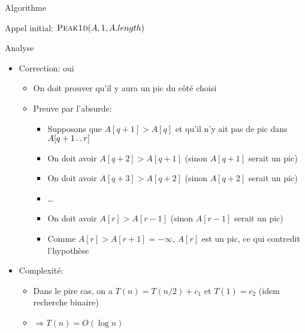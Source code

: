 \begin{frame}{Algorithme}

\begin{center}
{\small
{}
}
\end{center}

\centerline{Appel initial: $\textnormal{\scshape Peak1d}(A,1,A.length)$}

\end{frame}

\begin{frame}{Analyse}
\begin{itemize}
\item Correction: oui
\begin{itemize}
\item On doit prouver qu'il y aura un pic du côté choisi
\item Preuve par l'absurde:
\begin{itemize}
\item Supposons que $A[q+1]>A[q]$ et qu'il n'y ait pas de pic dans $A[q+1\mathinner{\ldotp\ldotp} r]$
\item On doit avoir $A[q+2]>A[q+1]$ (sinon $A[q+1]$ serait un pic)
\item On doit avoir $A[q+3]>A[q+2]$ (sinon $A[q+2]$ serait un pic)
\item \ldots
\item On doit avoir $A[r]>A[r-1]$ (sinon $A[r-1]$ serait un pic)
\item Comme $A[r]>A[r+1]=-\infty$, $A[r]$ est un pic, ce qui contredit l'hypothèse
\end{itemize}
\end{itemize}

\bigskip

\item Complexité:
\begin{itemize}
\item Dans le pire cas, on a $T(n)=T(n/2)+c_1$ et $T(1)=c_2$ (idem recherche binaire)
\item $\Rightarrow T(n)=O(\log n)$
\end{itemize}
\end{itemize}
\end{frame}

